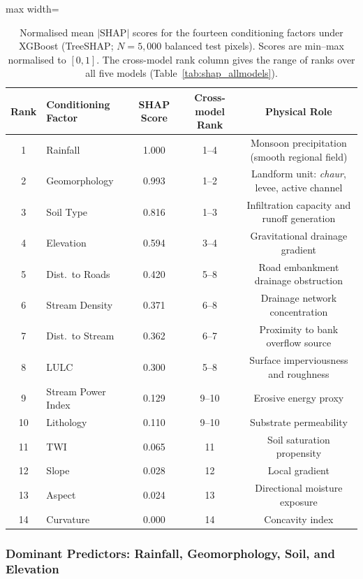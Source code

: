\documentclass[12pt, a4paper]{article}
\begin{document}
\begin{table}[H]
\centering
\caption{Normalised mean $|\text{SHAP}|$ scores for the fourteen conditioning factors under XGBoost (TreeSHAP; $N = 5{,}000$ balanced test pixels). Scores are min--max normalised to $[0,1]$. The cross-model rank column gives the range of ranks over all five models (Table~\ref{tab:shap_allmodels}).}
\label{tab:shap}
\begin{adjustbox}{max width=\linewidth}
\begin{tabular}{clccc}
\toprule
\textbf{Rank} & \textbf{Conditioning Factor} & \textbf{SHAP Score} & \textbf{Cross-model Rank} & \textbf{Physical Role} \\
\midrule
1  & Rainfall           & 1.000 & 1--4  & Monsoon precipitation (smooth regional field) \\
2  & Geomorphology      & 0.993 & 1--2  & Landform unit: \textit{chaur}, levee, active channel \\
3  & Soil Type          & 0.816 & 1--3  & Infiltration capacity and runoff generation \\
4  & Elevation          & 0.594 & 3--4  & Gravitational drainage gradient \\
5  & Dist.\ to Roads    & 0.420 & 5--8  & Road embankment drainage obstruction \\
6  & Stream Density     & 0.371 & 6--8  & Drainage network concentration \\
7  & Dist.\ to Stream   & 0.362 & 6--7  & Proximity to bank overflow source \\
8  & LULC               & 0.300 & 5--8  & Surface imperviousness and roughness \\
9  & Stream Power Index & 0.129 & 9--10 & Erosive energy proxy \\
10 & Lithology          & 0.110 & 9--10 & Substrate permeability \\
11 & TWI                & 0.065 & 11    & Soil saturation propensity \\
12 & Slope              & 0.028 & 12    & Local gradient \\
13 & Aspect             & 0.024 & 13    & Directional moisture exposure \\
14 & Curvature          & 0.000 & 14    & Concavity index \\
\bottomrule
\end{tabular}
\end{adjustbox}
\end{table}

\subsubsection{Dominant Predictors: Rainfall, Geomorphology, Soil, and Elevation}
\end{document}

